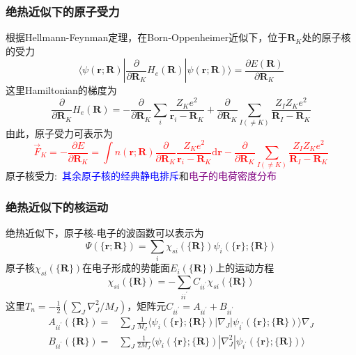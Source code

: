 \frame
{
	\frametitle{绝热近似下的原子受力}
	根据\textrm{Hellmann-Feynman}定理，在\textrm{Born-Oppenheimer}近似下，位于$\mathbf{R}_K$处的原子核的受力
	\begin{displaymath}
		\langle\psi(\mathbf{r};\mathbf{R})|\dfrac{\partial}{\partial{\mathbf{R}_K}}H_e(\mathbf{R})|\psi(\mathbf{r};\mathbf{R})\rangle=\dfrac{\partial E(\mathbf{R})}{\partial\mathbf{R}_K}
	\end{displaymath}
	这里\textrm{Hamiltonian}的梯度为
	\begin{displaymath}
		\dfrac{\partial}{\partial{\mathbf{R}_K}}H_e(\mathbf{R})=-\dfrac{\partial}{\partial{\mathbf{R}_K}}\sum_i\dfrac{Z_Ke^2}{\mathbf{r}_i-\mathbf{R}_K}+\dfrac{\partial}{\partial{\mathbf{R}_K}}\sum_{I(\neq K)}\dfrac{Z_IZ_Ke^2}{\mathbf{R}_I-\mathbf{R}_K}
	\end{displaymath}
	由此，原子受力可表示为
	\textcolor{red}{
	\begin{displaymath}
		\vec F_K=-\dfrac{\partial E}{\partial\mathbf{R}_K}=\int n(\mathbf{r};\mathbf{R})\dfrac{\partial}{\partial{\mathbf{R}_K}}\dfrac{Z_Ke^2}{\mathbf{r}_i-\mathbf{R}_K}\mathrm{d}\mathbf{r}-\dfrac{\partial}{\partial{\mathbf{R}_K}}\sum_{I(\neq K)}\dfrac{Z_IZ_Ke^2}{\mathbf{R}_I-\mathbf{R}_K}
	\end{displaymath}}
	原子核受力:~\textcolor{blue}{其余原子核的经典静电排斥}和\textcolor{purple}{电子的电荷密度分布}
}

\frame
{
	\frametitle{绝热近似下的核运动}
	绝热近似下，原子核-电子的波函数可以表示为
	\begin{displaymath}
		\Psi(\{\mathbf{r};\mathbf{R}\})=\sum_i\chi_{si}(\{\mathbf{R}\})\psi_i(\{\mathbf{r}\};\{\mathbf{R}\})
	\end{displaymath}
	原子核$\chi_{si}(\{\mathbf{R}\})$在电子形成的势能面$E_i(\{\mathbf{R}\})$上的运动方程
	\begin{displaymath}
		[T_N+E_i(\{\mathbf{R}\})-E_s]\chi_{si}(\{\mathbf{R}\})=-\sum_{ii^{\prime}}C_{ii^{\prime}}\chi_{si}(\{\mathbf{R}\})
	\end{displaymath}
	这里$T_n=-\frac12(\sum\limits_J\nabla_J^2/M_J)$，矩阵元$C_{ii^{\prime}}=A_{ii^{\prime}}+B_{ii^{\prime}}$
	\begin{displaymath}
		\begin{aligned}
			A_{ii^{\prime}}(\{\mathbf{R}\})=&\sum_J\frac1{M_J}\langle\psi_i(\{\mathbf{r}\};\{\mathbf{R}\})|\nabla_J|\psi_{i^{\prime}}(\{\mathbf{r}\};\{\mathbf{R}\})\rangle\nabla_J\\
			B_{ii^{\prime}}(\{\mathbf{R}\})=&\sum_J\frac1{2M_J}\langle\psi_i(\{\mathbf{r}\};\{\mathbf{R}\})|\nabla_J^2|\psi_{i^{\prime}}(\{\mathbf{r}\};\{\mathbf{R}\})\rangle\\
		\end{aligned}
	\end{displaymath}
	\fontsize{8.2pt}{4.2pt}
}

